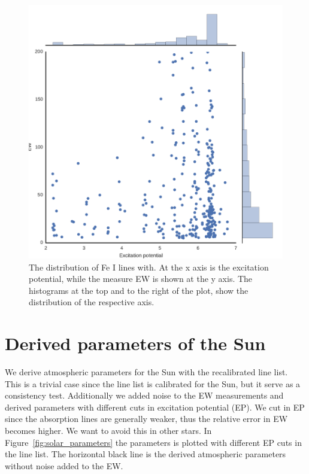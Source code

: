 \documentclass{aa}
\begin{document}
\begin{figure}[htpb]
    \centering
    \includegraphics[width=0.9\linewidth]{figures/EWvsEP_cut.pdf}
    \caption{The distribution of Fe I lines with. At the x axis is the
    excitation potential, while the measure EW is shown at the y axis.
    The histograms at the top and to the right of the plot, show the
    distribution of the respective axis.}
    \label{fig:Fe1_after_recal}
\end{figure}



\section{Derived parameters of the Sun}
\label{sec:derived_parameters_of_the_sun}
We derive atmospheric parameters for the Sun with the recalibrated line list.
This is a trivial case since the line list is calibrated for the Sun, but it
serve as a consistency test. Additionally we added noise to the EW measurements
and derived parameters with different cuts in excitation potential (EP). We cut
in EP since the absorption lines are generally weaker, thus the relative error
in EW becomes higher. We want to avoid this in other stars. In
Figure~\ref{fig:solar_parameters} the parameters is plotted with different EP
cuts in the line list. The horizontal black line is the derived atmospheric
parameters without noise added to the EW.
\end{document}
